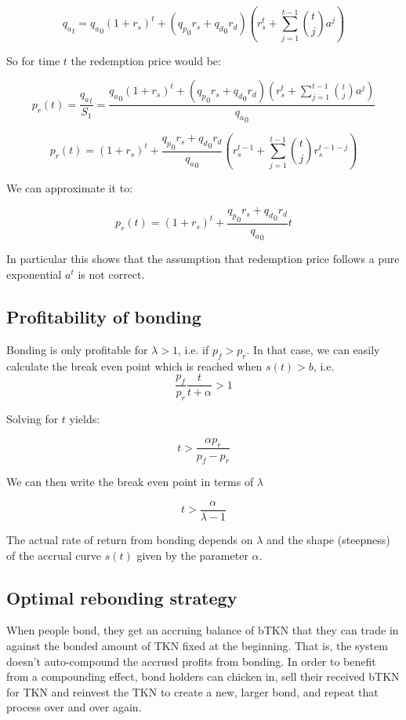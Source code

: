 \documentclass{article}
\begin{document}
\[
{q_a}_t = {q_a}_0(1+r_s)^t + ({q_p}_0 r_s + {q_d}_0 r_d) \left(r_s^t + \sum_{j=1}^{t-1} \binom{t}{j} a^j \right)
\]

So for time $t$ the redemption price would be:

\[
p_r(t) = \frac{{q_a}_t}{S_1} = \frac{{q_a}_0(1+r_s)^t + ({q_p}_0 r_s + {q_d}_0 r_d) \left(r_s^t + \sum_{j=1}^{t-1} \binom{t}{j} a^j \right)}{{q_a}_0}
\]

\begin{equation}
  \label{eq:conservative_p_r_base_2_a}
p_r(t) = (1+r_s)^t + \frac{{q_p}_0 r_s + {q_d}_0 r_d}{{q_a}_0} \left(r_s^{t-1} + \sum_{j=1}^{t-1} \binom{t}{j} r_s^{t-1-j} \right)
\end{equation}

We can approximate it to:

\begin{equation}
  \label{eq:conservative_p_r_base_2_b}
p_r(t) = (1+r_s)^t + \frac{{q_p}_0 r_s + {q_d}_0 r_d}{{q_a}_0} t
\end{equation}

In particular this shows that the assumption that redemption price follows a pure exponential $a^t$ is not correct.

\subsection{Profitability of bonding}
Bonding is only profitable for $\lambda>1$, i.e. if $p_f>p_r$. In that case, we can easily calculate the break even point which is reached when $s(t)>b$, i.e.
\begin{equation}
  \label{eq:break_even_0}
\frac{p_f}{p_r}\frac{t}{t+\alpha} > 1
\end{equation}

Solving for $t$ yields:

\begin{equation}
  \label{eq:break_even_1}
t > \frac{\alpha p_r}{p_f-p_r}
\end{equation}

We can then write the break even point in terms of $\lambda$

\begin{equation}
  \label{eq:break_even_2}
t > \frac{\alpha}{\lambda-1}
\end{equation}

The actual rate of return from bonding depends on $\lambda$ and the shape (steepness) of the accrual curve $s(t)$ given by the parameter $\alpha$.

\subsection{Optimal rebonding strategy}
When people bond, they get an accruing balance of bTKN that they can trade in against the bonded amount of TKN fixed at the beginning. That is, the system doesn't auto-compound the accrued profits from bonding. In order to benefit from a compounding effect, bond holders can chicken in, sell their received bTKN for TKN and reinvest the TKN to create a new, larger bond, and repeat that process over and over again.
\end{document}

